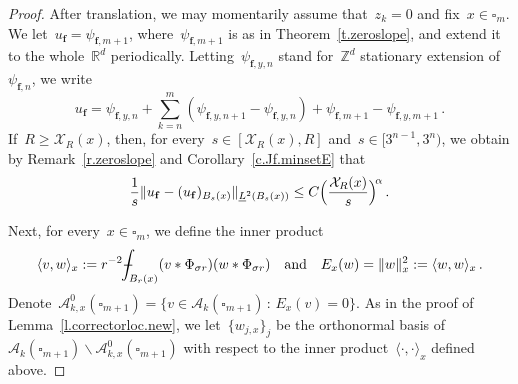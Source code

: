 \documentclass[11pt,twoside]{article} %
\let\oldsquare\square %
\renewcommand{\square}{\oldsquare}
\numberwithin{equation}{section}
\theoremstyle{definition}
\newcommand*{\Z}{\ensuremath{\mathbb{Z}}}
\newcommand*{\R}{\ensuremath{\mathbb{R}}}
\newcommand{\qand}{\quad \mbox{and} \quad }
\newcommand{\f}{\mathbf{f}}
\newcommand{\cu}{\square}
\newcommand{\X}{\mathcal{X}}
\newcommand{\indc}{\boldsymbol{1}}
\def\Xint#1{\mathchoice
{\XXint\displaystyle\textstyle{#1}}%
{\XXint\textstyle\scriptstyle{#1}}%
{\XXint\scriptstyle\scriptscriptstyle{#1}}%
{\XXint\scriptscriptstyle\scriptscriptstyle{#1}}%
\!\int}
\def\XXint#1#2#3{{\setbox0=\hbox{$#1{#2#3}{\int}$}
\vcenter{\hbox{$#2#3$}}\kern-.5\wd0}}
\def\fint{\Xint-}
\newcommand{\A}{\mathcal{A}}
\begin{document}
\begin{proof}
\smallskip 

After translation, we may momentarily assume that~$z_k = 0$ and fix~$x \in \cu_m$.  We let~$u_{\f} = \psi_{\f,m+1}$, where~$\psi_{\f,m+1}$ is as in Theorem~\ref{t.zeroslope}, and extend it to the whole~$\R^d$ periodically. Letting~$\psi_{\f,y,n}$ stand for~$\Z^d$ stationary extension of~$\psi_{\f,n}$, we write  
\begin{equation*}  
u_{\f} 
= 
\psi_{\f,y,n} 
+ \sum_{k=n}^{m} (\psi_{\f,y,n+1}  - \psi_{\f,y,n}) 
+ \psi_{\f,m+1} - \psi_{\f,y,m+1}\,.
\end{equation*}
If~$R \geq \X_R(x)$, then, for every~$s \in [\X_R(x),R]$ and~$s \in [3^{n-1},3^{n})$, we obtain by Remark~\ref{r.zeroslope} and Corollary~\ref{c.Jf.minsetE} that 
\begin{equation}  \label{e.fr.localization.minscale.prop}
\frac1s \| u_{\f} - (u_{\f})_{B_s(x)}  \|_{\underline{L}^2(B_s(x))}  
\leq 
C 
\Bigl( \frac{\X_R(x)}{s}  \Bigr)^{\! \alpha}
\,.
\end{equation}

\smallskip

Next, for every~$x \in \cu_m$, we define the inner product
\begin{align}  \label{e.fr.innerproduct}
\langle v,w\rangle_x
:= 
r^{-2}
\fint_{ B_{r}(x) } (v \ast \Phi_{\sigma r}) (w \ast \Phi_{\sigma r})
\qand
E_x(w) = \| w\|_x^2 := \langle w,w\rangle_x
\,. 
\end{align}
Denote~$\A_{k,x}^{0}(\cu_{m+1}) = \{ v \in \A_k(\cu_{m+1}) \, : \, E_x(v) = 0 \}$. As in the proof of Lemma~\ref{l.correctorloc.new}, we let~$\{w_{j,x}\}_j$ be the orthonormal basis of~$\A_{k}(\cu_{m+1}) \backslash \A_{k,x}^0(\cu_{m+1})$ with respect to the inner product~$\langle \cdot , \cdot \rangle_x$ defined above. 

\smallskip


\end{proof}
\end{document}
